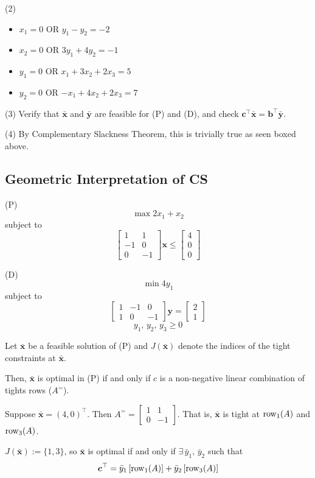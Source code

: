 (2)
\begin{itemize}
    \item $ x_1=0 $ OR $ \boxed{y_1-y_2=-2} $
    \item $ \boxed{x_2=0} $ OR $ 3y_1+4y_2=-1 $
    \item $ y_1=0 $ OR $ \boxed{x_1+3x_2+2x_3=5} $
    \item $ y_2=0 $ OR $ \boxed{-x_1+4x_2+2x_3=7} $
\end{itemize}

(3) Verify that $ \bm{\bar{x}} $ and $ \bm{\bar{y}} $ are
feasible for (P) and (D), and check
$ \bm{c}^\top \bm{\bar{x}}=\bm{b}^\top \bm{\bar{y}} $.

(4) By Complementary Slackness Theorem, this is trivially true as seen boxed
above.

\subsection{Geometric Interpretation of CS}
(P) \[ \max 2x_1+x_2 \]
subject to
\[ \begin{bmatrix}
    1 & 1\\
    -1 & 0\\
    0 & -1
\end{bmatrix}\bm{x}\le
\begin{bmatrix}
    4\\
    0\\
    0
\end{bmatrix} \]

(D)
\[ \min 4y_1 \]
subject to
\[ \begin{bmatrix}
    1 & -1 & 0\\
    1 & 0 & -1
\end{bmatrix}
\bm{y}=
\begin{bmatrix}
    2\\
    1
\end{bmatrix} \]
\[ y_1,\,y_2,\,y_3\ge 0 \]

Let $ \bm{\bar{x}} $ be a feasible solution of (P) and $ J(\bm{\bar{x}}) $
denote the indices of the tight constraints at $ \bm{\bar{x}} $.

Then, $ \bm{\bar{x}} $ is optimal in (P) if and only if $ c $ is a
non-negative linear combination of tights rows ($ A^= $).

Suppose $ \bm{\bar{x}}=(4,0)^\top $. Then $ A^= =\begin{bmatrix}
    1 & 1\\
    0 & -1
\end{bmatrix} $. That is, $ \bm{\bar{x}} $ is tight at $ \operatorname{row}_1(A) $
and $ \operatorname{row}_3(A) $. 

$ J(\bm{\bar{x}}):=\{1,3\} $, so $ \bm{\bar{x}} $
is optimal if and only if $ \exists \, \bar{y}_1,\,\bar{y}_2 $ such that
\[ \bm{c}^\top=\bar{y}_1\left[ \operatorname{row}_1(A) \right]+\bar{y}_2 \left[ \operatorname{row}_3(A) \right] \]

